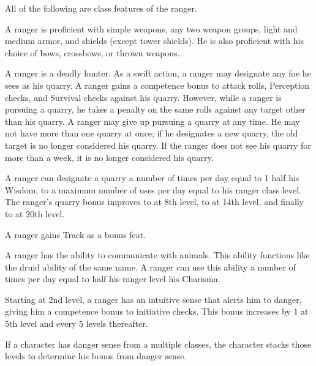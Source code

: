 
All of the following are class features of the ranger.

  A ranger is proficient with simple weapons, any two weapon groups, light and medium armor, and shields (except tower shields). He is also proficient with his choice of bows, crossbows, or thrown weapons.

 A ranger is a deadly hunter. As a swift action, a ranger may designate any foe he sees as his quarry. A ranger gains a  competence bonus to attack rolls, Perception checks, and Survival checks against his quarry. However, while a ranger is pursuing a quarry, he takes a  penalty on the same rolls against any target other than his quarry. A ranger may give up pursuing a quarry at any time. He may not have more than one quarry at once; if he designates a new quarry, the old target is no longer considered his quarry. If the ranger does not see his quarry for more than a week, it is no longer considered his quarry.

\par A ranger can designate a quarry a number of times per day equal to 1 \add half his Wisdom, to a maximum number of uses per day equal to his ranger class level. The ranger's quarry bonus improves to  at 8th level, to  at 14th level, and finally to  at 20th level.

 A ranger gains Track as a bonus feat.

 A ranger has the ability to communicate with animals. This ability functions like the druid ability of the same name. A ranger can use this ability a number of times per day equal to half his ranger level \add his Charisma.

 Starting at 2nd level, a ranger has an intuitive sense that alerts him to danger, giving him a  competence bonus to initiative checks. This bonus increases by 1 at 5th level and every 5 levels thereafter.
\par If a character has danger sense from a multiple classes, the character stacks those levels to determine his bonus from danger sense.

